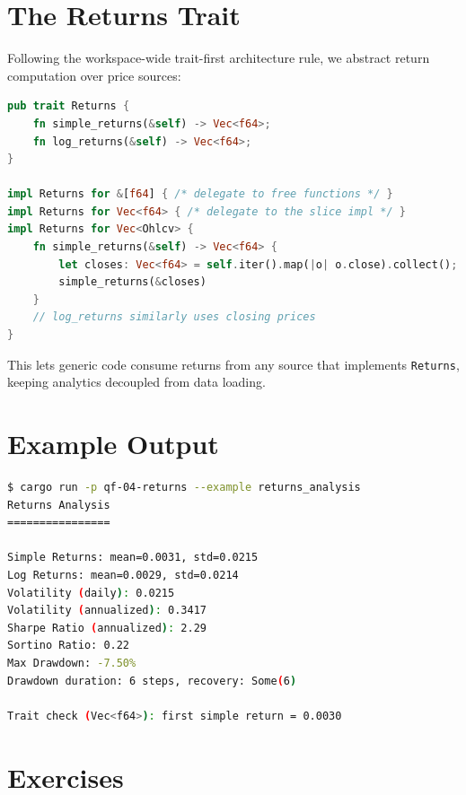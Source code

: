 \section{The Returns Trait}


Following the workspace-wide trait-first architecture rule, we abstract return
computation over price sources:

\begin{lstlisting}[language=Rust]
pub trait Returns {
    fn simple_returns(&self) -> Vec<f64>;
    fn log_returns(&self) -> Vec<f64>;
}

impl Returns for &[f64] { /* delegate to free functions */ }
impl Returns for Vec<f64> { /* delegate to the slice impl */ }
impl Returns for Vec<Ohlcv> {
    fn simple_returns(&self) -> Vec<f64> {
        let closes: Vec<f64> = self.iter().map(|o| o.close).collect();
        simple_returns(&closes)
    }
    // log_returns similarly uses closing prices
}
\end{lstlisting}

This lets generic code consume returns from any source that implements
\texttt{Returns}, keeping analytics decoupled from data loading.

\section{Example Output}

\begin{lstlisting}[language=bash]
$ cargo run -p qf-04-returns --example returns_analysis
Returns Analysis
================

Simple Returns: mean=0.0031, std=0.0215
Log Returns: mean=0.0029, std=0.0214
Volatility (daily): 0.0215
Volatility (annualized): 0.3417
Sharpe Ratio (annualized): 2.29
Sortino Ratio: 0.22
Max Drawdown: -7.50%
Drawdown duration: 6 steps, recovery: Some(6)

Trait check (Vec<f64>): first simple return = 0.0030
\end{lstlisting}

\section{Exercises}


